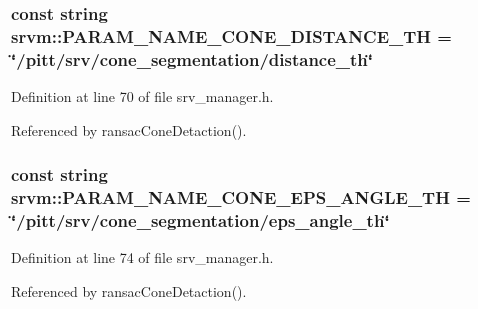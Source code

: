 \hypertarget{namespacesrvm_aeec863664b339e3c4808736477fe1378}{
\subsubsection[{P\-A\-R\-A\-M\-\_\-\-N\-A\-M\-E\-\_\-\-C\-O\-N\-E\-\_\-\-D\-I\-S\-T\-A\-N\-C\-E\-\_\-\-T\-H}]{\setlength{\rightskip}{0pt plus 5cm}const string srvm\-::\-P\-A\-R\-A\-M\-\_\-\-N\-A\-M\-E\-\_\-\-C\-O\-N\-E\-\_\-\-D\-I\-S\-T\-A\-N\-C\-E\-\_\-\-T\-H = \char`\"{}/pitt/srv/cone\-\_\-segmentation/distance\-\_\-th\char`\"{}}}\label{namespacesrvm_aeec863664b339e3c4808736477fe1378}


Definition at line 70 of file srv\-\_\-manager.\-h.



Referenced by ransac\-Cone\-Detaction().

\hypertarget{namespacesrvm_a6023448f3a02902eec73727de0699571}{
\subsubsection[{P\-A\-R\-A\-M\-\_\-\-N\-A\-M\-E\-\_\-\-C\-O\-N\-E\-\_\-\-E\-P\-S\-\_\-\-A\-N\-G\-L\-E\-\_\-\-T\-H}]{\setlength{\rightskip}{0pt plus 5cm}const string srvm\-::\-P\-A\-R\-A\-M\-\_\-\-N\-A\-M\-E\-\_\-\-C\-O\-N\-E\-\_\-\-E\-P\-S\-\_\-\-A\-N\-G\-L\-E\-\_\-\-T\-H = \char`\"{}/pitt/srv/cone\-\_\-segmentation/eps\-\_\-angle\-\_\-th\char`\"{}}}\label{namespacesrvm_a6023448f3a02902eec73727de0699571}


Definition at line 74 of file srv\-\_\-manager.\-h.



Referenced by ransac\-Cone\-Detaction().

